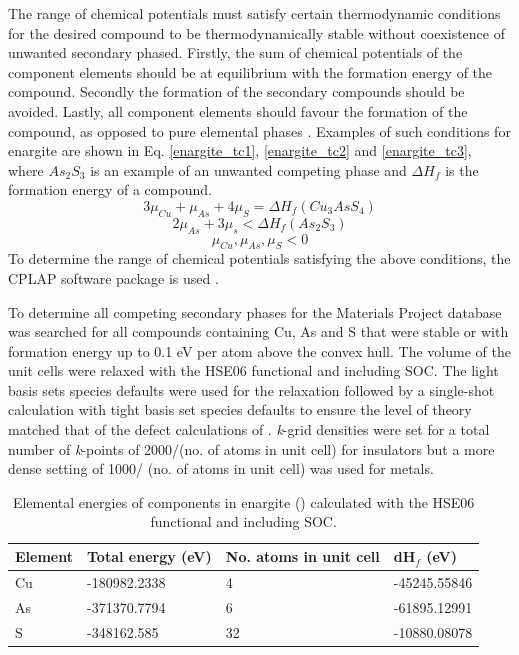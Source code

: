 \documentclass[11pt, twoside]{report}
\begin{document}
The range of chemical potentials must satisfy certain thermodynamic conditions for the desired compound to be thermodynamically stable without coexistence of unwanted secondary phased. Firstly, the sum of chemical potentials of the component elements should be at equilibrium with the formation energy of the compound. Secondly the formation of the secondary compounds should be avoided. Lastly, all component elements should favour the formation of the compound, as opposed to pure elemental phases \cite{defects_Chen}. Examples of such conditions for enargite are shown in Eq. \ref{enargite_tc1}, \ref{enargite_tc2} and \ref{enargite_tc3}, where $As_2S_3$ is an example of an unwanted competing phase and $\Delta H_f$ is the formation energy of a compound.
\begin{equation}\label{enargite_tc1}
3\mu_{Cu} + \mu_{As} + 4\mu_{S} = \Delta H_f(Cu_3AsS_4)    
\end{equation}
\begin{equation}\label{enargite_tc2}
2\mu_{As} + 3\mu_{s} < \Delta H_f(As_2S_3)
\end{equation}
\begin{equation}\label{enargite_tc3}
\mu_{Cu}, \mu_{As}, \mu_{S} < 0    
\end{equation}
To determine the range of chemical potentials satisfying the above conditions, the CPLAP software package is used \cite{cplap}. 

To determine all competing secondary phases for {\enargite} the Materials Project \cite{materials_project} database was searched for all compounds containing Cu, As and S that were stable or with formation energy up to 0.1 eV per atom above the convex hull. The volume of the unit cells were relaxed with the HSE06 functional and including SOC. The light basis sets species defaults were used for the relaxation followed by a single-shot calculation with tight basis set species defaults to ensure the level of theory matched that of the defect calculations of {\enargite}. \textit{k}-grid densities were set for a total number of \textit{k}-points of 2000/(no. of atoms in unit cell) for insulators but a more dense setting of 1000/ (no. of atoms in unit cell) was used for metals.

\begin{table}[h!]
\begin{tabular}{@{}llll@{}}
\toprule
Element & Total energy (eV) & No. atoms in unit cell & dH$_f$ (eV)      \\ \midrule
Cu      & -180982.2338      & 4                      & -45245.55846 \\
As      & -371370.7794      & 6                      & -61895.12991 \\
S       & -348162.585       & 32                     & -10880.08078 \\ \bottomrule
\end{tabular}
\caption{Elemental energies of components in enargite ({\enargite}) calculated with the HSE06 functional and including SOC.}\label{enargite_elements}
\end{table}
\end{document}
